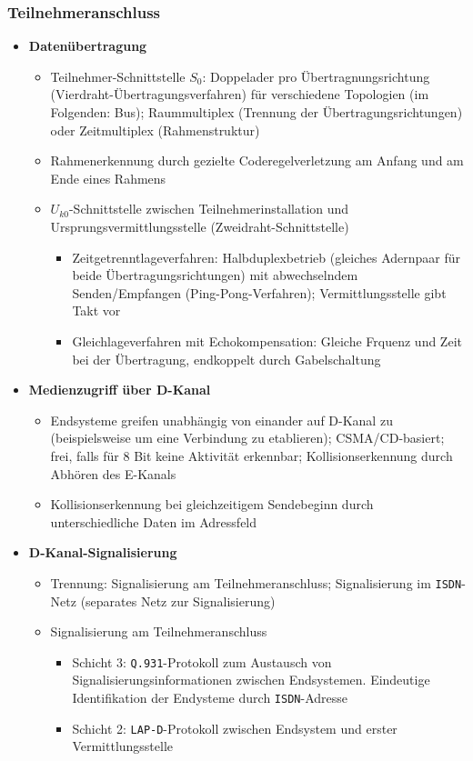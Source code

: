 \subsubsection{Teilnehmeranschluss}
\begin{itemize}
	\item \textbf{Datenübertragung}
	\begin{itemize}
		\item Teilnehmer-Schnittstelle \(S_0\): Doppelader pro Übertragnungsrichtung (Vierdraht-Übertragungsverfahren) für verschiedene Topologien (im Folgenden: Bus); Raummultiplex (Trennung der Übertragungsrichtungen) oder Zeitmultiplex (Rahmenstruktur)
		\item Rahmenerkennung durch gezielte Coderegelverletzung am Anfang und am Ende eines Rahmens
		\item \(U_{k0}\)-Schnittstelle zwischen Teilnehmerinstallation und Ursprungsvermittlungsstelle (Zweidraht-Schnittstelle)
		\begin{itemize}
			\item Zeitgetrenntlageverfahren: Halbduplexbetrieb (gleiches Adernpaar für beide Übertragungsrichtungen) mit abwechselndem Senden/Empfangen (Ping-Pong-Verfahren); Vermittlungsstelle gibt Takt vor
			\item Gleichlageverfahren mit Echokompensation: Gleiche Frquenz und Zeit bei der Übertragung, endkoppelt durch Gabelschaltung
		\end{itemize}
	\end{itemize}
	\item \textbf{Medienzugriff über D-Kanal}
	\begin{itemize}
		\item Endsysteme greifen unabhängig von einander auf D-Kanal zu (beispielsweise um eine Verbindung zu etablieren); CSMA/CD-basiert; frei, falls für 8 Bit keine Aktivität erkennbar; Kollisionserkennung durch Abhören des E-Kanals
		\item Kollisionserkennung bei gleichzeitigem Sendebeginn durch unterschiedliche Daten im Adressfeld
	\end{itemize}
	\item \textbf{D-Kanal-Signalisierung}
	\begin{itemize}
		\item Trennung: Signalisierung am Teilnehmeranschluss; Signalisierung im \texttt{ISDN}-Netz (separates Netz zur Signalisierung)
		\item Signalisierung am Teilnehmeranschluss
		\begin{itemize}
			\item Schicht 3: \texttt{Q.931}-Protokoll zum Austausch von Signalisierungsinformationen zwischen Endsystemen. Eindeutige Identifikation der Endysteme durch \texttt{ISDN}-Adresse
			\item Schicht 2: \texttt{LAP-D}-Protokoll zwischen Endsystem und erster Vermittlungsstelle
		\end{itemize}
	\end{itemize}
\end{itemize}

